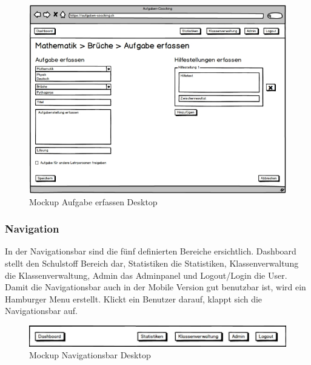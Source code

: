\begin{minipage}{\textwidth}
	\begin{figure}[H]
	\centering
		\includegraphics[width=\textwidth, keepaspectratio]{images/Mockups/AufgabeErfassen_Desktop.png}
		\caption{Mockup Aufgabe erfassen Desktop}
	\end{figure}
\end{minipage}


\subsubsection*{Navigation}
In der Navigationsbar sind die fünf definierten Bereiche ersichtlich. Dashboard stellt den Schulstoff Bereich dar, Statistiken die Statistiken, Klassenverwaltung die Klassenverwaltung, Admin das Adminpanel und Logout/Login die User. \\

Damit die Navigationsbar auch in der Mobile Version gut benutzbar ist, wird ein Hamburger Menu erstellt. Klickt ein Benutzer darauf, klappt sich die Navigationsbar auf. \\

\begin{minipage}{\textwidth}
	\begin{figure}[H]
	\centering
		\includegraphics[width=\textwidth, keepaspectratio]{images/Mockups/Navigationsleiste_Desktop.png}
		\caption{Mockup Navigationsbar Desktop}
	\end{figure}
\end{minipage}


